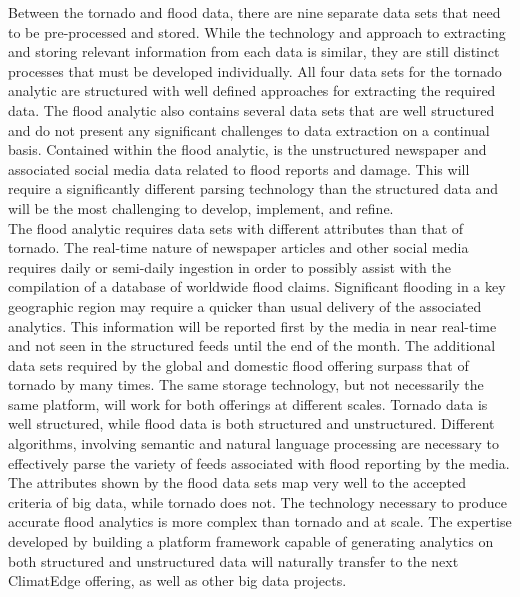 Between the tornado and flood data, there are nine separate data sets that need to be pre-processed and stored. While the technology and approach to extracting and storing relevant information from each data is similar, they are still distinct processes that must be developed individually. All four data sets for the tornado analytic are structured with well defined approaches for extracting the required data. The flood analytic also contains several data sets that are well structured and do not present any significant challenges to data extraction on a continual basis. Contained within the flood analytic, is the unstructured newspaper and associated social media data related to flood reports and damage. This will require a significantly different parsing technology than the structured data and will be the most challenging to develop, implement, and refine.\\

The flood analytic requires data sets with different attributes than that of tornado. The real-time nature of newspaper articles and other social media requires daily or semi-daily ingestion in order to possibly assist with the compilation of a database of worldwide flood claims. Significant flooding in a key geographic region may require a quicker than usual delivery of the associated analytics. This information will be reported first by the media in near real-time and not seen in the structured feeds until the end of the month. The additional data sets required by the global and domestic flood offering surpass that of tornado by many times. The same storage technology, but not necessarily the same platform, will work for both offerings at different scales. Tornado data is well structured, while flood data is both structured and unstructured. Different algorithms, involving semantic and natural language processing are necessary to effectively parse the variety of feeds associated with flood reporting by the media.  The attributes shown by the flood data sets map very well to the accepted criteria of big data, while tornado does not. The technology necessary to produce accurate flood analytics is more complex than tornado and at scale. The expertise developed by building a platform framework capable of generating analytics on both structured and unstructured data will naturally transfer to the next ClimatEdge offering, as well as other big data projects.